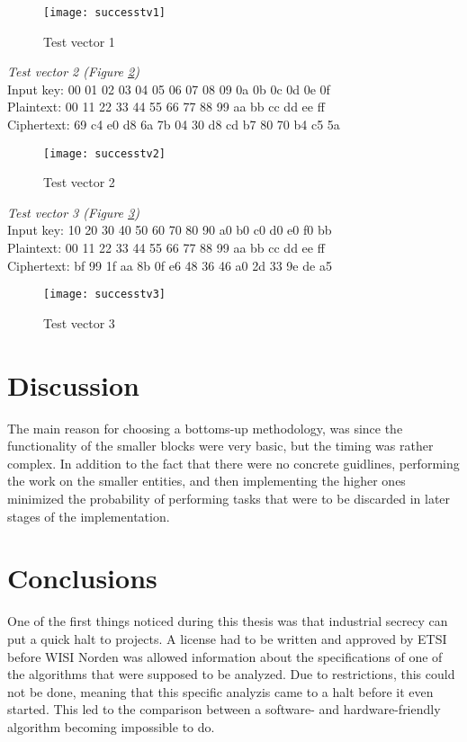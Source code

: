 \begin{figure}
  \texttt{[image: successtv1]}
  \caption{Test vector 1}
  \label{test:1}
\end{figure}

\emph{Test vector 2 (Figure \ref{test:2})}\\
Input key: 00 01 02 03 04 05 06 07 08 09 0a 0b 0c 0d 0e 0f\\
Plaintext: 00 11 22 33 44 55 66 77 88 99 aa bb cc dd ee ff\\
Ciphertext: 69 c4 e0 d8 6a 7b 04 30 d8 cd b7 80 70 b4 c5 5a

\begin{figure}
  \texttt{[image: successtv2]}
  \caption{Test vector 2}
  \label{test:2}
\end{figure}

\emph{Test vector 3 (Figure \ref{test:3})} \\
Input key: 10 20 30 40 50 60 70 80 90 a0 b0 c0 d0 e0 f0 bb\\
Plaintext: 00 11 22 33 44 55 66 77 88 99 aa bb cc dd ee ff\\
Ciphertext: bf 99 1f aa 8b 0f e6 48 36 46 a0 2d 33 9e de a5

\begin{figure}
  \texttt{[image: successtv3]}
  \caption{Test vector 3}
  \label{test:3}
\end{figure}

\section{Discussion}
The main reason for choosing a bottoms-up methodology, was since the 
functionality of the smaller blocks were very basic, but the timing was 
rather complex. In addition to the fact that there were no concrete 
guidlines, performing the work on the smaller entities, and then 
implementing the higher ones minimized the probability of performing 
tasks that were to be discarded in later stages of the implementation.

\section{Conclusions}
One of the first things noticed during this thesis was that industrial
secrecy can put a quick halt to projects. A license had to be written 
and approved by ETSI before WISI Norden was allowed information about 
the specifications of one of the algorithms that were supposed to be
analyzed. Due to restrictions, this could not be done, meaning that 
this specific analyzis came to a halt before it even started. This 
led to the comparison between a software- and hardware-friendly 
algorithm becoming impossible to do. 

